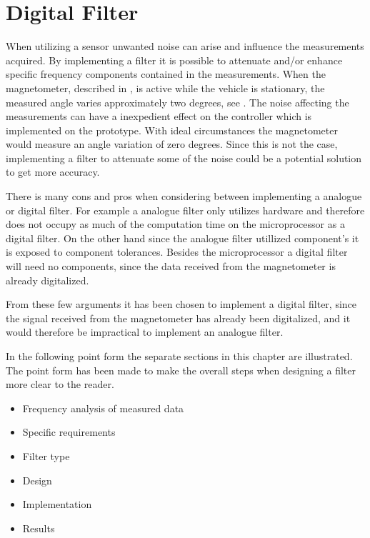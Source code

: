 \chapter{Digital Filter}\label{chap:digitalFilter}

When utilizing a sensor unwanted noise can arise and influence the measurements acquired. By implementing a filter it is possible to attenuate and/or enhance specific frequency components contained in the measurements. When the magnetometer, described in , is active while the vehicle is stationary, the measured angle varies approximately two degrees, see . The noise affecting the measurements can have a inexpedient effect on the controller which is implemented on the prototype. With ideal circumstances the magnetometer would measure an angle variation of zero degrees. Since this is not the case, implementing a filter to attenuate some of the noise could be a potential solution to get more accuracy.

There is many cons and pros when considering between implementing a analogue or digital filter. For example a analogue filter only utilizes hardware and therefore does not occupy as much of the computation time on the microprocessor as a digital filter. On the other hand since the analogue filter utillized component's it is exposed to component tolerances. Besides the microprocessor a digital filter will need no components, since the data received from the magnetometer is already digitalized.

From these few arguments it has been chosen to implement a digital filter, since the signal received from the magnetometer has already been digitalized, and it would therefore be impractical to implement an analogue filter.

In the following point form the separate sections in this chapter are illustrated. The point form has been made to make the overall steps when designing a filter more clear to the reader.

\begin{itemize}
\item Frequency analysis of measured data
\item Specific requirements
\item Filter type
\item Design
\item Implementation
\item Results
\end{itemize}

